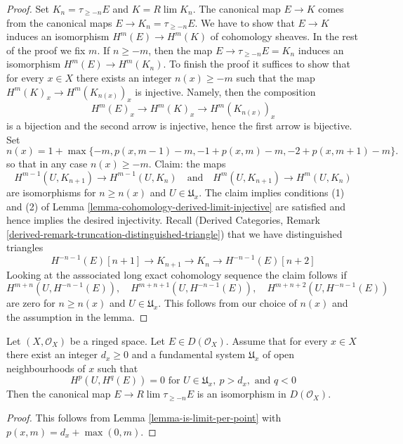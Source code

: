 \begin{proof}
Set $K_n = \tau_{\geq -n}E$ and $K = R\lim K_n$.
The canonical map $E \to K$
comes from the canonical maps $E \to K_n = \tau_{\geq -n}E$.
We have to show that $E \to K$ induces an isomorphism
$H^m(E) \to H^m(K)$ of cohomology sheaves. In the rest of the
proof we fix $m$. If $n \geq -m$, then
the map $E \to \tau_{\geq -n}E = K_n$ induces an isomorphism
$H^m(E) \to H^m(K_n)$.
To finish the proof it suffices to show that for every $x \in X$
there exists an integer $n(x) \geq -m$ such that the map
$H^m(K)_x \to H^m(K_{n(x)})_x$ is injective. Namely, then
the composition
$$
H^m(E)_x \to H^m(K)_x \to H^m(K_{n(x)})_x
$$
is a bijection and the second arrow is injective, hence the
first arrow is bijective. Set
$$
n(x) = 1 + \max\{-m, p(x, m - 1) - m, -1 + p(x, m) - m, -2 + p(x, m + 1) - m\}.
$$
so that in any case $n(x) \geq -m$. Claim: the maps
$$
H^{m - 1}(U, K_{n + 1}) \to H^{m - 1}(U, K_n)
\quad\text{and}\quad
H^m(U, K_{n + 1}) \to H^m(U, K_n)
$$
are isomorphisms for $n \geq n(x)$ and $U \in \mathfrak{U}_x$.
The claim implies conditions
(1) and (2) of Lemma \ref{lemma-cohomology-derived-limit-injective}
are satisfied and hence implies the desired injectivity.
Recall (Derived Categories, Remark
\ref{derived-remark-truncation-distinguished-triangle})
that we have distinguished triangles
$$
H^{-n - 1}(E)[n + 1] \to
K_{n + 1} \to K_n \to H^{-n - 1}(E)[n + 2]
$$
Looking at the asssociated long exact cohomology sequence the claim follows if
$$
H^{m + n}(U, H^{-n - 1}(E)),\quad
H^{m + n + 1}(U, H^{-n - 1}(E)),\quad
H^{m + n + 2}(U, H^{-n - 1}(E))
$$
are zero for $n \geq n(x)$ and $U \in \mathfrak{U}_x$.
This follows from our choice of $n(x)$
and the assumption in the lemma.
\end{proof}

\begin{lemma}
\label{lemma-is-limit-spaltenstein}
\begin{reference}
\cite[Proposition 3.13]{Spaltenstein}
\end{reference}
Let $(X, \mathcal{O}_X)$ be a ringed space. Let $E \in D(\mathcal{O}_X)$.
Assume that for every $x \in X$ there exist an integer $d_x \geq 0$ and
a fundamental system $\mathfrak{U}_x$ of open neighbourhoods of $x$
such that
$$
H^p(U, H^q(E)) = 0 \text{ for }
U \in \mathfrak{U}_x,\ p > d_x, \text{ and }q < 0
$$
Then the canonical map $E \to R\lim \tau_{\geq -n} E$
is an isomorphism in $D(\mathcal{O}_X)$.
\end{lemma}

\begin{proof}
This follows from Lemma \ref{lemma-is-limit-per-point}
with $p(x, m) = d_x + \max(0, m)$.
\end{proof}


